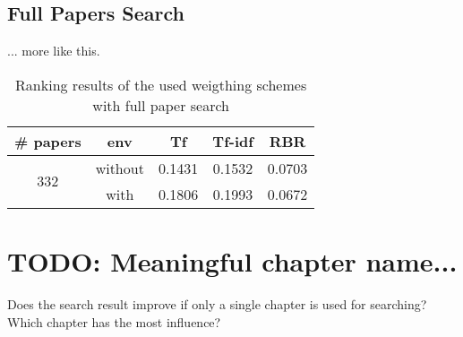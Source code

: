 \subsection{Full Papers Search}

... more like this.

\begin{table}
  \centering
  \begin{tabular}{ | c | c | c | c | c | }
    \hline
    \rowcolor{lightblue}
    \textbf{\# papers} & \textbf{env} & \textbf{Tf} & \textbf{Tf-idf} & \textbf{RBR} \\ \hline
    \multirow{2}{*}{332} & without & 0.1431 & 0.1532 & 0.0703 \\ \cline{2-5}
                         & with   & 0.1806 & 0.1993 & 0.0672 \\ \hline
  \end{tabular}
  \caption[Ranking results with full paper search]{Ranking results of the used weigthing schemes with full paper search}
  \label{tbl:ranking_result_full}
\end{table}













\section{TODO: Meaningful chapter name...}
Does the search result improve if only a single chapter is used for searching? \\
Which chapter has the most influence?

